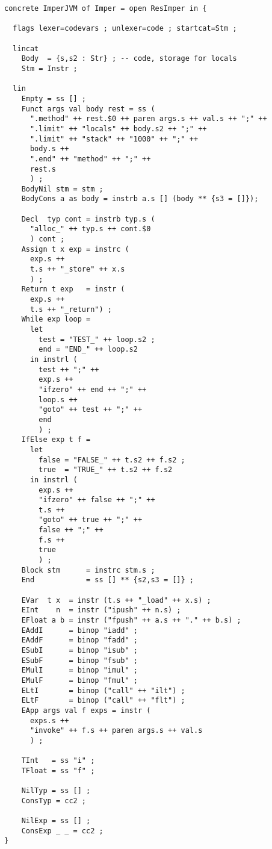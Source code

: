 \documentclass[12pt]{article}
\begin{document}
\small
\begin{verbatim}
concrete ImperJVM of Imper = open ResImper in {

  flags lexer=codevars ; unlexer=code ; startcat=Stm ;

  lincat
    Body  = {s,s2 : Str} ; -- code, storage for locals
    Stm = Instr ;

  lin
    Empty = ss [] ;
    Funct args val body rest = ss (
      ".method" ++ rest.$0 ++ paren args.s ++ val.s ++ ";" ++
      ".limit" ++ "locals" ++ body.s2 ++ ";" ++
      ".limit" ++ "stack" ++ "1000" ++ ";" ++
      body.s ++
      ".end" ++ "method" ++ ";" ++
      rest.s 
      ) ;
    BodyNil stm = stm ;
    BodyCons a as body = instrb a.s [] (body ** {s3 = []});

    Decl  typ cont = instrb typ.s (
      "alloc_" ++ typ.s ++ cont.$0
      ) cont ;
    Assign t x exp = instrc (
      exp.s ++ 
      t.s ++ "_store" ++ x.s
      ) ;
    Return t exp   = instr (
      exp.s ++ 
      t.s ++ "_return") ;
    While exp loop = 
      let 
        test = "TEST_" ++ loop.s2 ; 
        end = "END_" ++ loop.s2
      in instrl (
        test ++ ";" ++
        exp.s ++ 
        "ifzero" ++ end ++ ";" ++ 
        loop.s ++
        "goto" ++ test ++ ";" ++ 
        end
        ) ;
    IfElse exp t f = 
      let 
        false = "FALSE_" ++ t.s2 ++ f.s2 ; 
        true  = "TRUE_" ++ t.s2 ++ f.s2
      in instrl (
        exp.s ++ 
        "ifzero" ++ false ++ ";" ++ 
        t.s ++
        "goto" ++ true ++ ";" ++
        false ++ ";" ++
        f.s ++ 
        true
        ) ;
    Block stm      = instrc stm.s ;
    End            = ss [] ** {s2,s3 = []} ;

    EVar  t x  = instr (t.s ++ "_load" ++ x.s) ;
    EInt    n  = instr ("ipush" ++ n.s) ;
    EFloat a b = instr ("fpush" ++ a.s ++ "." ++ b.s) ;
    EAddI      = binop "iadd" ;
    EAddF      = binop "fadd" ;
    ESubI      = binop "isub" ;
    ESubF      = binop "fsub" ;
    EMulI      = binop "imul" ;
    EMulF      = binop "fmul" ;
    ELtI       = binop ("call" ++ "ilt") ;
    ELtF       = binop ("call" ++ "flt") ;
    EApp args val f exps = instr (
      exps.s ++
      "invoke" ++ f.s ++ paren args.s ++ val.s
      ) ;

    TInt   = ss "i" ;
    TFloat = ss "f" ;

    NilTyp = ss [] ;
    ConsTyp = cc2 ;

    NilExp = ss [] ;
    ConsExp _ _ = cc2 ;
}

\end{verbatim}
\normalsize
\newpage
\end{document}
